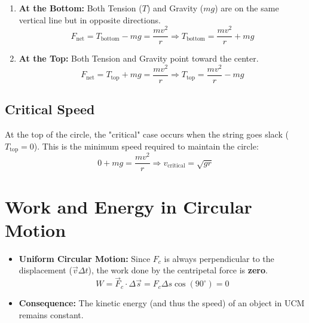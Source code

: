 \documentclass{article}
\begin{document}
\begin{enumerate}
    \item \textbf{At the Bottom:} Both Tension ($T$) and Gravity ($mg$) are on the same vertical line but in opposite directions.
    \begin{equation*}
        F_{\text{net}} = T_{\text{bottom}} - mg = \frac{mv^2}{r} \Rightarrow T_{\text{bottom}} = \frac{mv^2}{r} + mg
    \end{equation*}
    
    \item \textbf{At the Top:} Both Tension and Gravity point toward the center.
    \begin{equation*}
        F_{\text{net}} = T_{\text{top}} + mg = \frac{mv^2}{r} \Rightarrow T_{\text{top}} = \frac{mv^2}{r} - mg
    \end{equation*}
\end{enumerate}



\subsection{Critical Speed}
At the top of the circle, the "critical" case occurs when the string goes slack ($T_{\text{top}} = 0$). This is the minimum speed required to maintain the circle:
\begin{equation}
    0 + mg = \frac{mv^2}{r} \Rightarrow v_{\text{critical}} = \sqrt{gr}
\end{equation}

\section{Work and Energy in Circular Motion}

\begin{itemize}
    \item \textbf{Uniform Circular Motion:} Since $F_c$ is always perpendicular to the displacement ($\vec{v} \Delta t$), the work done by the centripetal force is \textbf{zero}.
    \begin{equation*}
        W = \vec{F}_c \cdot \Delta \vec{s} = F_c \Delta s \cos(90^\circ) = 0
    \end{equation*}
    \item \textbf{Consequence:} The kinetic energy (and thus the speed) of an object in UCM remains constant.
\end{itemize}
\end{document}
